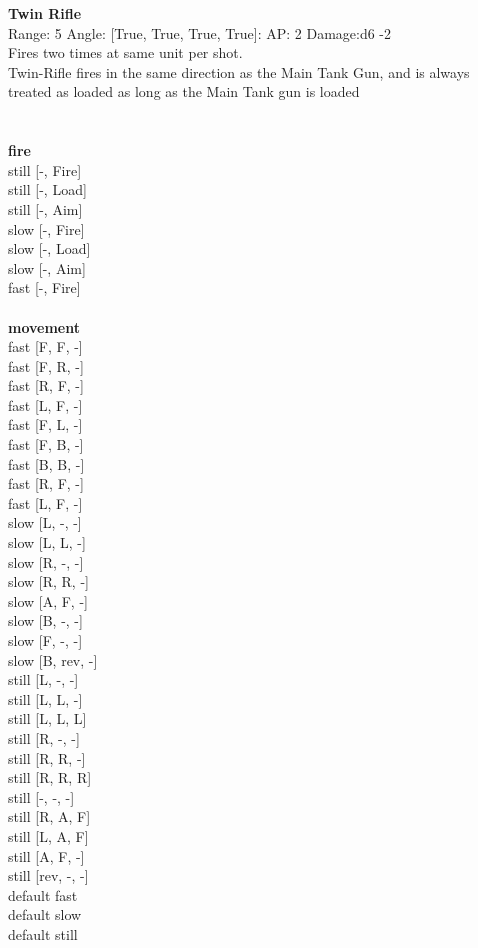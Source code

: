 {\bf Twin Rifle } \\



Range: 5  Angle: [True, True, True, True]: AP: 2 Damage:d6 -2 \\
Fires two times at same unit per shot.\\Twin-Rifle fires in the same direction as the Main Tank Gun, and is always treated as loaded as long as the Main Tank gun is loaded\\ 




 
\ \\



\ \\ {\bf fire } \\
still [-, Fire] \\
still [-, Load] \\
still [-, Aim] \\
slow [-, Fire] \\
slow [-, Load] \\
slow [-, Aim] \\
fast [-, Fire] \\
\ \\ {\bf movement } \\
fast [F, F, -] \\
fast [F, R, -] \\
fast [R, F, -] \\
fast [L, F, -] \\
fast [F, L, -] \\
fast [F, B, -] \\
fast [B, B, -] \\
fast [R, F, -] \\
fast [L, F, -] \\
slow [L, -, -] \\
slow [L, L, -] \\
slow [R, -, -] \\
slow [R, R, -] \\
slow [A, F, -] \\
slow [B, -, -] \\
slow [F, -, -] \\
slow [B, rev, -] \\
still [L, -, -] \\
still [L, L, -] \\
still [L, L, L] \\
still [R, -, -] \\
still [R, R, -] \\
still [R, R, R] \\
still [-, -, -] \\
still [R, A, F] \\
still [L, A, F] \\
still [A, F, -] \\
still [rev, -, -] \\
default fast \\
default slow \\
default still \\


